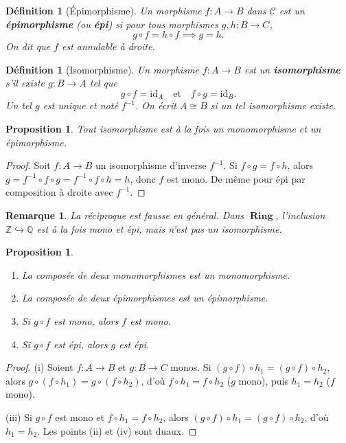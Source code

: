 \documentclass[a4paper,12pt]{book}
\DeclareMathOperator{\Ring}{\mathbf{Ring}}
\newcommand{\id}{\mathrm{id}}
\newcommand{\Z}{\mathbb{Z}}
\newcommand{\Q}{\mathbb{Q}}
\newtheorem{proposition}[theoreme]{Proposition}
\newtheorem{definition}[theoreme]{Définition}
\newtheorem*{remarque}{Remarque}
\begin{document}
\begin{definition}[Épimorphisme]\label{def:epi}
Un morphisme $f : A \to B$ dans $\mathcal{C}$ est un \textbf{épimorphisme} (ou \textbf{épi}) si pour tous morphismes $g, h : B \to C$,
\[
  g \circ f = h \circ f \implies g = h.
\]
On dit que $f$ est \emph{annulable à droite}.
\end{definition}

\begin{definition}[Isomorphisme]\label{def:iso}
Un morphisme $f : A \to B$ est un \textbf{isomorphisme} s'il existe $g : B \to A$ tel que
\[
  g \circ f = \id_A \quad \text{et} \quad f \circ g = \id_B.
\]
Un tel $g$ est unique et noté $f^{-1}$. On écrit $A \cong B$\index{$\cong$} si un tel isomorphisme existe.
\end{definition}

\begin{proposition}\label{prop:iso-mono-epi}
Tout isomorphisme est à la fois un monomorphisme et un épimorphisme.
\end{proposition}

\begin{proof}
Soit $f : A \to B$ un isomorphisme d'inverse $f^{-1}$. Si $f \circ g = f \circ h$, alors $g = f^{-1} \circ f \circ g = f^{-1} \circ f \circ h = h$, donc $f$ est mono. De même pour épi par composition à droite avec $f^{-1}$.
\end{proof}

\begin{remarque}
La réciproque est fausse en général. Dans $\Ring$, l'inclusion $\Z \hookrightarrow \Q$ est à la fois mono et épi, mais n'est pas un isomorphisme.
\end{remarque}

\begin{proposition}\label{prop:comp-mono-epi}
\begin{enumerate}[label=(\roman*)]
  \item La composée de deux monomorphismes est un monomorphisme.
  \item La composée de deux épimorphismes est un épimorphisme.
  \item Si $g \circ f$ est mono, alors $f$ est mono.
  \item Si $g \circ f$ est épi, alors $g$ est épi.
\end{enumerate}
\end{proposition}

\begin{proof}
(i) Soient $f : A \to B$ et $g : B \to C$ monos. Si $(g \circ f) \circ h_1 = (g \circ f) \circ h_2$, alors $g \circ (f \circ h_1) = g \circ (f \circ h_2)$, d'où $f \circ h_1 = f \circ h_2$ ($g$ mono), puis $h_1 = h_2$ ($f$ mono).

(iii) Si $g \circ f$ est mono et $f \circ h_1 = f \circ h_2$, alors $(g \circ f) \circ h_1 = (g \circ f) \circ h_2$, d'où $h_1 = h_2$. Les points (ii) et (iv) sont duaux.
\end{proof}
\end{document}
